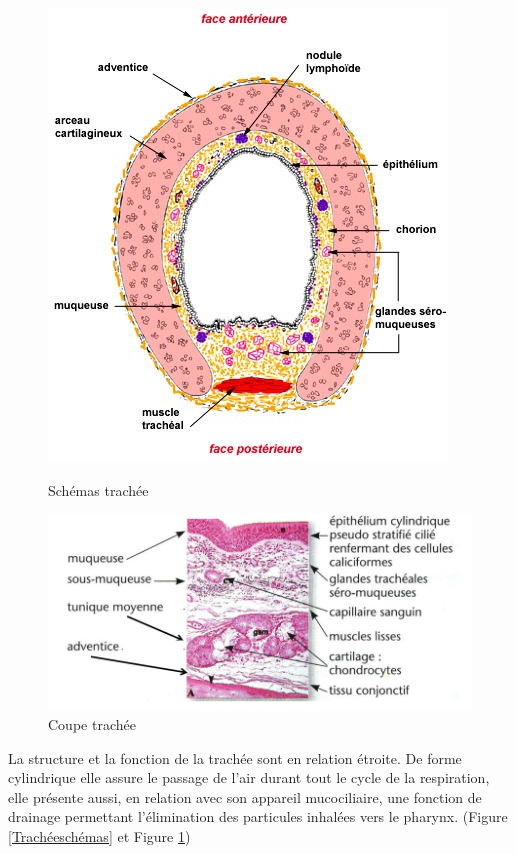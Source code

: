 \begin{figure}[h!]
    \begin{minipage}[b]{0.4\linewidth}
        \centering \includegraphics[scale=0.4]{gfx/Trach_esch_mas.jpg}
        \captionsetup{type=figure}
        \centering \caption{Schémas trachée}
        \label{Trachéeschémas}
    \end{minipage}\hfill
    \begin{minipage}[b]{0.7\linewidth}
        \centering \includegraphics[scale=0.4]{gfx/Trach_ecoupe.jpg}
        \centering \caption{Coupe trachée}
        \label{Trachéecoupe}
    \end{minipage}
\end{figure}

La structure et la fonction de la trachée sont en relation étroite. De forme cylindrique elle assure le passage de l'air durant tout le cycle de la respiration, elle présente aussi, en relation avec son appareil mucociliaire, une fonction de drainage permettant l'élimination des particules inhalées vers le pharynx. (Figure \ref{Trachéeschémas} et Figure \ref{Trachéecoupe})



